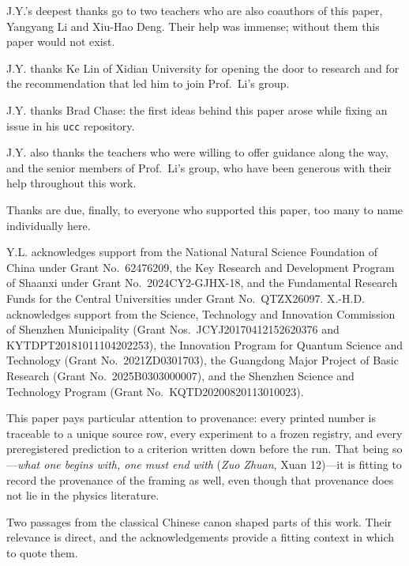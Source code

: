 \documentclass[aps,prx,reprint,superscriptaddress,floatfix,longbibliography]{revtex4-2}
\begin{document}
\begin{acknowledgements}
J.Y.'s deepest thanks go to two teachers who are also coauthors of this
paper, Yangyang Li and Xiu-Hao Deng.  Their help was immense; without them
this paper would not exist.

J.Y. thanks Ke Lin of Xidian University for opening the door to research
and for the recommendation that led him to join Prof.~Li's group.

J.Y. thanks Brad Chase: the first ideas behind this paper arose while
fixing an issue in his \texttt{ucc} repository.

J.Y. also thanks the teachers who were willing to offer guidance along the
way, and the senior members of Prof.~Li's group, who have been generous
with their help throughout this work.

Thanks are due, finally, to everyone who supported this paper, too many to
name individually here.

Y.L. acknowledges support from the National Natural Science Foundation of
China under Grant No.~62476209, the Key Research and Development Program of
Shaanxi under Grant No.~2024CY2-GJHX-18, and the Fundamental Research Funds
for the Central Universities under Grant No.~QTZX26097.  X.-H.D.
acknowledges support from the Science, Technology and Innovation Commission of Shenzhen
Municipality (Grant Nos.~JCYJ20170412152620376 and KYTDPT20181011104202253),
the Innovation Program for Quantum Science and Technology (Grant
No.~2021ZD0301703), the Guangdong Major Project of Basic Research (Grant
No.~2025B0303000007), and the Shenzhen Science and Technology Program
(Grant No.~KQTD20200820113010023).

\ifdefined\PRRSubmissionVersion
\else
This paper pays particular attention to provenance: every printed number is
traceable to a unique source row, every experiment to a frozen registry, and
every preregistered prediction to a criterion written down before the run.  That being
so---\emph{what one begins with, one must end with} (\emph{Zuo Zhuan},
Xuan 12)---it is fitting to record the provenance of the framing as well,
even though that provenance does not lie in the physics literature.
\fi

\ifdefined\QuantumSubmissionVersion
\else\ifdefined\PRRSubmissionVersion
\else
Two passages from the classical Chinese canon shaped parts of this work.
Their relevance is direct, and the acknowledgements provide a fitting
context in which to quote them.


\end{acknowledgements}
\end{document}
